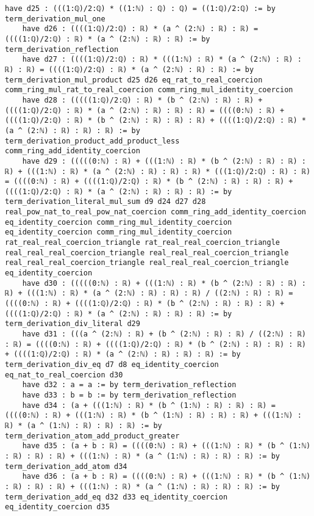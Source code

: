 \documentclass{article}
\begin{document}
\begin{tcolorbox}[colback=white!10, width=\linewidth]
\begin{lstlisting}[language=Lean4]
    have d25 : (((1:ℚ)/2:ℚ) * ((1:ℕ) : ℚ) : ℚ) = ((1:ℚ)/2:ℚ) := by term_derivation_mul_one
    have d26 : ((((1:ℚ)/2:ℚ) : ℝ) * (a ^ (2:ℕ) : ℝ) : ℝ) = ((((1:ℚ)/2:ℚ) : ℝ) * (a ^ (2:ℕ) : ℝ) : ℝ) := by term_derivation_reflection
    have d27 : ((((1:ℚ)/2:ℚ) : ℝ) * (((1:ℕ) : ℝ) * (a ^ (2:ℕ) : ℝ) : ℝ) : ℝ) = ((((1:ℚ)/2:ℚ) : ℝ) * (a ^ (2:ℕ) : ℝ) : ℝ) := by term_derivation_mul_product d25 d26 eq_rat_to_real_coercion comm_ring_mul_rat_to_real_coercion comm_ring_mul_identity_coercion
    have d28 : (((((1:ℚ)/2:ℚ) : ℝ) * (b ^ (2:ℕ) : ℝ) : ℝ) + ((((1:ℚ)/2:ℚ) : ℝ) * (a ^ (2:ℕ) : ℝ) : ℝ) : ℝ) = ((((0:ℕ) : ℝ) + ((((1:ℚ)/2:ℚ) : ℝ) * (b ^ (2:ℕ) : ℝ) : ℝ) : ℝ) + ((((1:ℚ)/2:ℚ) : ℝ) * (a ^ (2:ℕ) : ℝ) : ℝ) : ℝ) := by term_derivation_product_add_product_less comm_ring_add_identity_coercion
    have d29 : (((((0:ℕ) : ℝ) + (((1:ℕ) : ℝ) * (b ^ (2:ℕ) : ℝ) : ℝ) : ℝ) + (((1:ℕ) : ℝ) * (a ^ (2:ℕ) : ℝ) : ℝ) : ℝ) * (((1:ℚ)/2:ℚ) : ℝ) : ℝ) = ((((0:ℕ) : ℝ) + ((((1:ℚ)/2:ℚ) : ℝ) * (b ^ (2:ℕ) : ℝ) : ℝ) : ℝ) + ((((1:ℚ)/2:ℚ) : ℝ) * (a ^ (2:ℕ) : ℝ) : ℝ) : ℝ) := by term_derivation_literal_mul_sum d9 d24 d27 d28 real_pow_nat_to_real_pow_nat_coercion comm_ring_add_identity_coercion eq_identity_coercion comm_ring_mul_identity_coercion eq_identity_coercion comm_ring_mul_identity_coercion rat_real_real_coercion_triangle rat_real_real_coercion_triangle real_real_real_coercion_triangle real_real_real_coercion_triangle real_real_real_coercion_triangle real_real_real_coercion_triangle eq_identity_coercion
    have d30 : (((((0:ℕ) : ℝ) + (((1:ℕ) : ℝ) * (b ^ (2:ℕ) : ℝ) : ℝ) : ℝ) + (((1:ℕ) : ℝ) * (a ^ (2:ℕ) : ℝ) : ℝ) : ℝ) / ((2:ℕ) : ℝ) : ℝ) = ((((0:ℕ) : ℝ) + ((((1:ℚ)/2:ℚ) : ℝ) * (b ^ (2:ℕ) : ℝ) : ℝ) : ℝ) + ((((1:ℚ)/2:ℚ) : ℝ) * (a ^ (2:ℕ) : ℝ) : ℝ) : ℝ) := by term_derivation_div_literal d29
    have d31 : (((a ^ (2:ℕ) : ℝ) + (b ^ (2:ℕ) : ℝ) : ℝ) / ((2:ℕ) : ℝ) : ℝ) = ((((0:ℕ) : ℝ) + ((((1:ℚ)/2:ℚ) : ℝ) * (b ^ (2:ℕ) : ℝ) : ℝ) : ℝ) + ((((1:ℚ)/2:ℚ) : ℝ) * (a ^ (2:ℕ) : ℝ) : ℝ) : ℝ) := by term_derivation_div_eq d7 d8 eq_identity_coercion eq_nat_to_real_coercion d30
    have d32 : a = a := by term_derivation_reflection
    have d33 : b = b := by term_derivation_reflection
    have d34 : (a + (((1:ℕ) : ℝ) * (b ^ (1:ℕ) : ℝ) : ℝ) : ℝ) = ((((0:ℕ) : ℝ) + (((1:ℕ) : ℝ) * (b ^ (1:ℕ) : ℝ) : ℝ) : ℝ) + (((1:ℕ) : ℝ) * (a ^ (1:ℕ) : ℝ) : ℝ) : ℝ) := by term_derivation_atom_add_product_greater
    have d35 : (a + b : ℝ) = ((((0:ℕ) : ℝ) + (((1:ℕ) : ℝ) * (b ^ (1:ℕ) : ℝ) : ℝ) : ℝ) + (((1:ℕ) : ℝ) * (a ^ (1:ℕ) : ℝ) : ℝ) : ℝ) := by term_derivation_add_atom d34
    have d36 : (a + b : ℝ) = ((((0:ℕ) : ℝ) + (((1:ℕ) : ℝ) * (b ^ (1:ℕ) : ℝ) : ℝ) : ℝ) + (((1:ℕ) : ℝ) * (a ^ (1:ℕ) : ℝ) : ℝ) : ℝ) := by term_derivation_add_eq d32 d33 eq_identity_coercion eq_identity_coercion d35

\end{lstlisting}
\end{tcolorbox}
\end{document}
